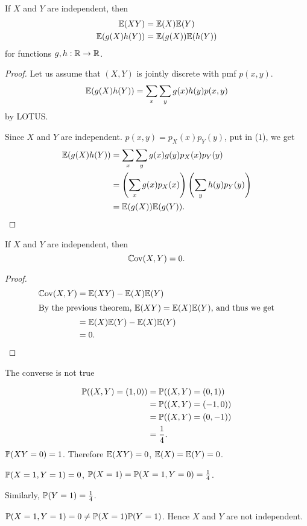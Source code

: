 \documentclass[10pt, a4paper]{article}
\begin{document}
\begin{theorem}
    If $X$ and $Y$ are independent,
    then
    \begin{align*}
        \E(XY) &= \E(X)\E(Y) \\
        \E(g(X)h(Y)) &= \E(g(X))\E(h(Y))
    \end{align*}
    for functions $g, h : \R \rightarrow \R$.
    \begin{proof}
        Let us assume that $(X, Y)$ is jointly discrete with pmf $p(x, y)$.
        \begin{equation}
            \E(g(X)h(Y)) = \sum_{x}\sum_{y}g(x)h(y)p(x, y)
        \end{equation}
        by LOTUS.

        Since $X$ and $Y$ are independent.
        $p(x, y) = p_X(x)p_Y(y)$,
        put in ($1$),
        we get
        \begin{align*}
            \E(g(X)h(Y)) &= \sum_{x}\sum_{y}g(x)g(y)p_X(x)p_Y(y) \\
            &= \left(\sum_{x}g(x)p_X(x)\right)\left(\sum_{y}h(y)p_Y(y)\right) \\
            &= \E(g(X))\E(g(Y)).
        \end{align*}
    \end{proof}
\end{theorem}

\begin{corollary}
    If $X$ and $Y$ are independent,
    then
    \[
    \Cov(X, Y) = 0.
    \]
    \begin{proof}
        \begin{align*}
            \Cov(X, Y) &= \E(XY) - \E(X)\E(Y) \\
            \intertext{By the previous theorem,
            $\E(XY) = \E(X)\E(Y)$,
            and thus we get}
            &= \E(X)\E(Y) - \E(X)\E(Y) \\
            &= 0.
        \end{align*}
    \end{proof}
\end{corollary}

The converse is not true
\begin{example}
    \begin{align*}
        \P((X, Y) = (1, 0)) &= \P((X, Y) = (0, 1)) \\
        &= \P((X, Y) = (-1, 0)) \\
        &= \P((X, Y) = (0, -1)) \\
        &= \frac{1}{4}.
    \end{align*}
    $\P(XY = 0) = 1$.
    Therefore $\E(XY) = 0$,
    $\E(X) = \E(Y) = 0$.

    $\P(X = 1, Y = 1) = 0$,
    $\P(X = 1) = \P(X = 1, Y = 0) = \frac{1}{4}$.

    Similarly,
    $\P(Y = 1) = \frac{1}{4}$.

    $\P(X = 1, Y = 1) = 0 \neq \P(X = 1)\P(Y = 1)$.
    Hence $X$ and $Y$ are not independent.
\end{example}
\end{document}
